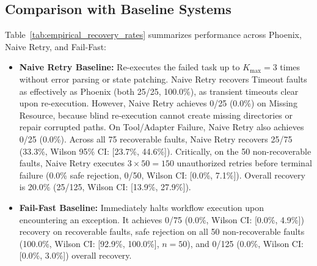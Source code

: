 \documentclass[conference]{IEEEtran}
\begin{document}
\subsection{Comparison with Baseline Systems}
Table~\ref{tab:empirical_recovery_rates} summarizes performance across Phoenix, Naive Retry, and Fail-Fast:
\begin{itemize}
    \item \textbf{Naive Retry Baseline:} Re-executes the failed task up to $K_{\text{max}} = 3$ times without error parsing or state patching. Naive Retry recovers Timeout faults as effectively as Phoenix (both 25/25, 100.0\%), as transient timeouts clear upon re-execution. However, Naive Retry achieves 0/25 (0.0\%) on Missing Resource, because blind re-execution cannot create missing directories or repair corrupted paths. On Tool/Adapter Failure, Naive Retry also achieves 0/25 (0.0\%). Across all 75 recoverable faults, Naive Retry recovers 25/75 (33.3\%, Wilson 95\% CI: [23.7\%, 44.6\%]). Critically, on the 50 non-recoverable faults, Naive Retry executes $3 \times 50 = 150$ unauthorized retries before terminal failure (0.0\% safe rejection, 0/50, Wilson CI: [0.0\%, 7.1\%]). Overall recovery is 20.0\% (25/125, Wilson CI: [13.9\%, 27.9\%]).
    \item \textbf{Fail-Fast Baseline:} Immediately halts workflow execution upon encountering an exception. It achieves 0/75 (0.0\%, Wilson CI: [0.0\%, 4.9\%]) recovery on recoverable faults, safe rejection on all 50 non-recoverable faults (100.0\%, Wilson CI: [92.9\%, 100.0\%], $n=50$), and 0/125 (0.0\%, Wilson CI: [0.0\%, 3.0\%]) overall recovery.
\end{itemize}
\end{document}
